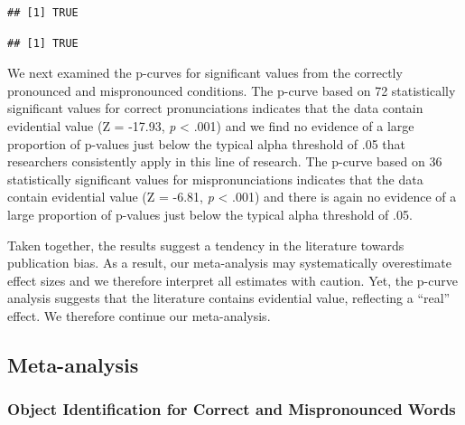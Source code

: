\documentclass[man]{apa6}
\theoremstyle{definition}
\theoremstyle{definition}
\theoremstyle{definition}
\theoremstyle{remark}
\begin{document}
\begin{verbatim}
## [1] TRUE
\end{verbatim}

\begin{verbatim}
## [1] TRUE
\end{verbatim}

We next examined the p-curves for significant values from the correctly
pronounced and mispronounced conditions. The p-curve based on 72
statistically significant values for correct pronunciations indicates
that the data contain evidential value (Z = -17.93, \emph{p} \textless{}
.001) and we find no evidence of a large proportion of p-values just
below the typical alpha threshold of .05 that researchers consistently
apply in this line of research. The p-curve based on 36 statistically
significant values for mispronunciations indicates that the data contain
evidential value (Z = -6.81, \emph{p} \textless{} .001) and there is
again no evidence of a large proportion of p-values just below the
typical alpha threshold of .05.

Taken together, the results suggest a tendency in the literature towards
publication bias. As a result, our meta-analysis may systematically
overestimate effect sizes and we therefore interpret all estimates with
caution. Yet, the p-curve analysis suggests that the literature contains
evidential value, reflecting a \enquote{real} effect. We therefore
continue our meta-analysis.

\subsection{Meta-analysis}\label{meta-analysis-1}

\subsubsection{Object Identification for Correct and Mispronounced
Words}\label{object-identification-for-correct-and-mispronounced-words}
\end{document}
